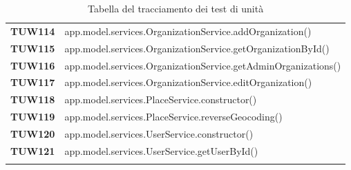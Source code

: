 \documentclass[../../piano-di-qualifica.tex]{subfiles}
\begin{document}
\begin{longtable}[H]{>{\centering\bfseries}m{3cm} >{}m{13cm}}
  TUW114             & app.model.services.OrganizationService.addOrganization\@()                                              \\


  TUW115             & app.model.services.OrganizationService.getOrganizationById\@()                                          \\

  TUW116             & app.model.services.OrganizationService.getAdminOrganizations\@()                                        \\

  TUW117             & app.model.services.OrganizationService.editOrganization\@()                                             \\



  TUW118             & app.model.services.PlaceService.constructor\@()                                                         \\

  TUW119             & app.model.services.PlaceService.reverseGeocoding\@()                                                    \\


  TUW120             & app.model.services.UserService.constructor\@()                                                          \\

  TUW121             & app.model.services.UserService.getUserById\@()                                                          \\




  \rowcolor{white}
  \caption{Tabella del tracciamento dei test di unità}%
  \label{tab:tabella_tracciamento_test_di_unita}
\end{longtable}


\end{document}
